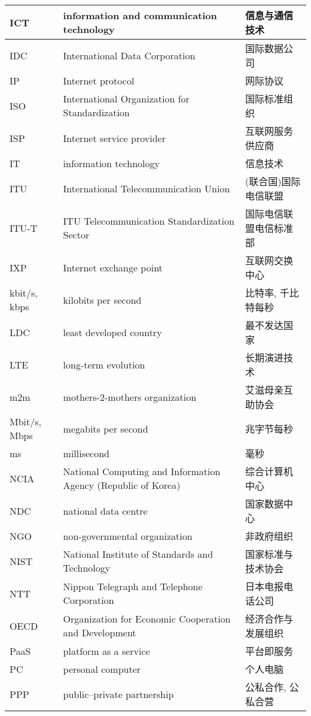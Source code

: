 \documentclass[a4paper, UTF8, 12pt]{article}
\begin{document}
\begin{longtable}{lm{8cm}m{5cm}}
    \hline
    ICT & information and communication technology & 信息与通信技术\\
    \hline
    IDC & International Data Corporation & 国际数据公司\\
    \hline
    IP & Internet protocol & 网际协议\\
    \hline
    ISO & International Organization for Standardization & 国际标准组织\\
    \hline
    ISP & Internet service provider & 互联网服务供应商\\
    \hline
    IT & information technology & 信息技术\\
    \hline
    ITU & International Telecommunication Union & (联合国)国际电信联盟\\
    \hline
    ITU-T & ITU Telecommunication Standardization Sector & 国际电信联盟电信标准部\\
    \hline
    IXP & Internet exchange point & 互联网交换中心\\
    \hline
    kbit/s, kbps & kilobits per second & 比特率, 千比特每秒\\
    \hline
    LDC & least developed country & 最不发达国家\\
    \hline
    LTE & long-term evolution & 长期演进技术\\
    \hline
    m2m & mothers-2-mothers organization & 艾滋母亲互助协会 \\
    \hline
    Mbit/s, Mbps & megabits per second & 兆字节每秒\\
    \hline
    ms & millisecond & 毫秒\\
    \hline
    NCIA & National Computing and Information Agency (Republic of Korea) & 综合计算机中心\\
    \hline
    NDC & national data centre & 国家数据中心\\
    \hline
    NGO & non-governmental organization & 非政府组织\\
    \hline
    NIST & National Institute of Standards and Technology & 国家标准与技术协会\\
    \hline
    NTT & Nippon Telegraph and Telephone Corporation & 日本电报电话公司\\
    \hline
    OECD & Organization for Economic Cooperation and Development & 经济合作与发展组织\\
    \hline
    PaaS & platform as a service & 平台即服务\\
    \hline
    PC & personal computer & 个人电脑\\
    \hline
    PPP & public–private partnership & 公私合作, 公私合营\\

\end{longtable}
\end{document}
